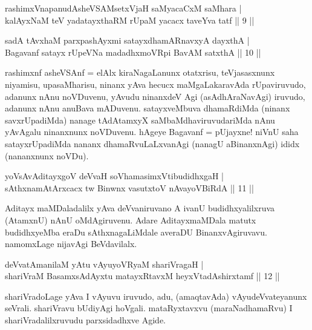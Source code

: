 
\begin{shl}
rashimxVnapanudAsheVSAMsetxVjaH saMyacaCxM saMhara | \\
kalAyxNaM teV yadatayxthaRM rUpaM yacacx taveYva tatf \hfill||  9 || 
\end{shl}

\begin{shl}
sadA tAvx\s haM parxpashAyxmi satayxdhamARnavxyA dayxthA  | \\
Bagavanf satayx rUpeVNa madadhxmoVR\s pi BavAM satxthA \hfill||  10 || 
\end{shl}

\begin{artha} 
rashimxnf asheVSAnf = elAlx kiraNagaLanunx otatxrisu, teVjasasxnunx 
niyamisu, upasaMharisu, ninanx yAva hecucx maMgaLakaravAda 
rUpaviruvudo, adanunx nAnu noVDuvenu, yAvudu ninanxdeV Agi 
(asAdhAraNavAgi) iruvudo, adanunx nAnu anuBava mADuvenu. satayxveMbuva 
dhamaRdiMda (ninanx savxrUpadiMda) nanage tAdAtamxyX 
saMbaMdhaviruvudariMda nAnu yAvAgalu ninanxnunx noVDuvenu. hAgeye 
Bagavanf = pUjayxne! niVnU saha satayxrUpadiMda nananx 
dhamaRvuLaLxvanAgi (nanagU aBinanxnAgi) ididx (nananxnunx noVDu).
\end{artha}


\begin{shl}
yoV\s sAvAditayxgoV deVvaH soV\s hamasimxVtibudidhxgaH | \\
sAthxnamAtArxcacx tw Binwnx vasutxtoV nA\s \s vayoVBiRdA \hfill||  11 || 
\end{shl}

\begin{artha} 
Aditayx maMDaladalilx yAva deVvaniruvano A ivanU budidhxyalilxruva 
(AtamxnU) nAnU oMdAgiruvenu. Adare AditayxmaMDala matutx budidhxyeMba 
eraDu sAthxnagaLiMdale averaDU BinanxvAgiruvavu. namomxLage nijavAgi 
BeVdavilalx.
\end{artha}


\begin{shl}
deVvatAmanilaM yAtu vAyuyoVR\s yaM shariVragaH | \\
shariVraM BasamxsAdAyxtu matayxRtavxM heyxVtadAshirxtamf \hfill||  12 || 
\end{shl}

\begin{artha} 
shariVradoLage yAva I vAyuvu iruvudo, adu, (amaqtavAda) 
vAyudeVvateyanunx seVrali. shariVravu bUdiyAgi hoVgali. mataRyxtavxvu 
(maraNadhamaRvu) I shariVradalilxruvudu parxsidadhxve Agide.
\end{artha}

